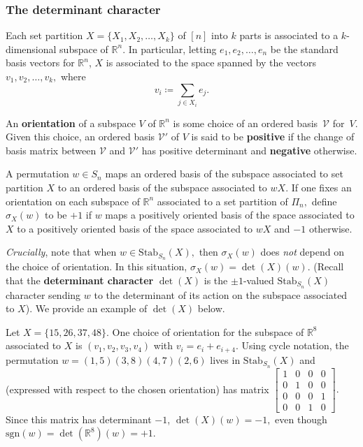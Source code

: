 \documentclass[ALCO, Unicode]{cedram}
\def\stab{\mathrm{Stab}}
\def\sgn{\mathrm{sgn}}
\begin{document}
\subsubsection{The determinant character} \label{sec:det-char}
Each set partition $X = \{X_1, X_2, \ldots, X_k\}$ of $[n]$ into $k$ parts is associated to a $k$-dimensional subspace of $\mathbb{R}^n.$ In particular, letting $e_1, e_2, \ldots, e_n$ be the standard basis vectors for $\mathbb{R}^n$, $X$ is associated to the space spanned by the vectors $v_1, v_2, \ldots, v_k,$ where \[v_i \coloneqq  \sum_{j \in X_i}e_j.\]

An \textbf{orientation} of a subspace $V$ of $\mathbb{R}^n$ is some choice of an ordered basis~$\mathcal{V}$ for~$V.$ Given this choice, an ordered basis $\mathcal{V}'$ of $V$ is said to be \textbf{positive} if the change of basis matrix between $\mathcal{V}$ and $\mathcal{V'}$  has positive determinant and \textbf{negative} otherwise.

A permutation $w \in S_n$ maps an ordered basis of the subspace associated to set partition $X$ to an ordered basis of the subspace associated to $w X.$ If one fixes an orientation on each subspace of $\mathbb{R}^n$ associated to a set partition of $\Pi_n,$ define \textbf{$\sigma_X(w)$} to be $+1$ if $w$ maps a positively oriented basis of the space associated to $X$ to a positively oriented basis of the space associated to $w X$ and $-1$ otherwise.

\textit{Crucially}, note that when $w \in \stab_{S_n}(X),$ then $\sigma_X(w)$ does \textit{not} depend on the choice of orientation. In this situation, $\sigma_X(w) = \det(X)(w).$ (Recall that the \textbf{determinant character }\textbf{$\det(X)$} is the $\pm 1$-valued $\stab_{S_n}(X)$ character sending $w$ to the determinant of its action on the subspace associated to $X$). We provide an example of $\det(X)$ below.

\begin{exam}
    Let $X = \{15, 26, 37, 48\}.$ One choice of orientation for the subspace of $\mathbb{R}^8$ associated to $X$ is $(v_1, v_2, v_3, v_4)$ with $v_i = e_i + e_{i + 4}.$ Using cycle notation, the permutation $w = (1, 5)(3, 8)(4, 7)(2, 6)$ lives in $\stab_{S_n}(X)$ and (expressed with respect to  the chosen orientation) has matrix $\left[ \begin{smallmatrix}
       1 & 0 & 0 & 0\\
       0 & 1 & 0 & 0\\
       0 & 0 & 0 & 1 \\
       0 & 0 & 1 & 0 
    \end{smallmatrix}\right].$ Since this matrix has determinant $-1$, $\det(X)(w) = -1,$ even though $\sgn(w) = \det\left(\mathbb{R}^8\right)(w) = +1.$
\end{exam}
\end{document}
